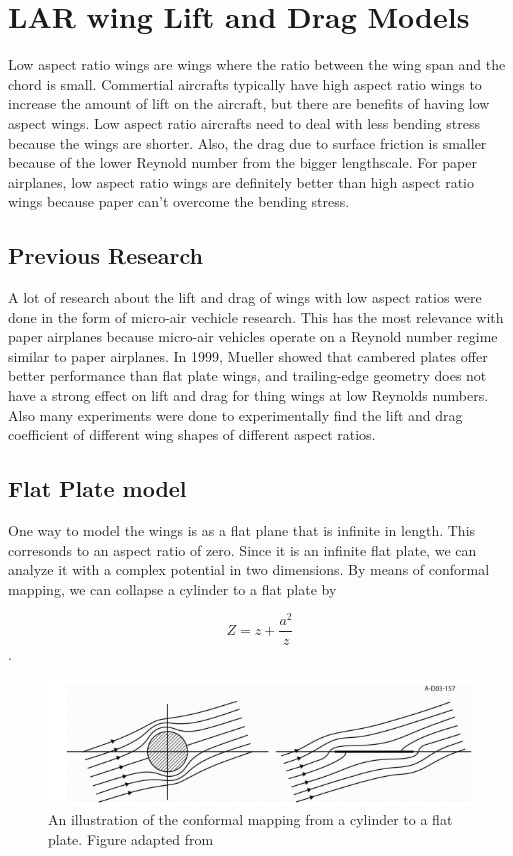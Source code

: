 
\section{LAR wing Lift and Drag Models}

Low aspect ratio wings are wings where the ratio between the wing span and
the chord is small. Commertial aircrafts typically have high aspect ratio wings
to increase the amount of lift on the aircraft, but there are benefits of having
low aspect wings. Low aspect ratio aircrafts need to deal with less bending
stress because the wings are shorter. Also, the drag due to surface friction is
smaller because of the lower Reynold number from the bigger lengthscale.
For paper airplanes, low aspect ratio wings are definitely better than high
aspect ratio wings because paper can't overcome the
bending stress.


\subsection{Previous Research}

A lot of research about the lift and drag of wings with low aspect ratios  were done in the form of
micro-air vechicle research. This has the most relevance with paper airplanes because
micro-air vehicles operate on a Reynold number regime similar to paper airplanes. 
In 1999, Mueller showed that cambered plates offer better performance than flat plate wings, and
trailing-edge geometry does not have a strong effect on lift and drag
for thing wings at low Reynolds numbers. Also many experiments were done to experimentally
find the lift and drag coefficient of different wing shapes of different aspect ratios.

\subsection{Flat Plate model}

One way to model the wings is as a flat plane that is infinite in length. This corresonds to
an aspect ratio of zero. Since it is
an infinite flat plate, we can analyze it with a complex potential in two dimensions.
By means of conformal mapping, we can collapse a cylinder to a flat plate by

\[Z = z + \frac{a^2}{z}\].

\begin{figure}[hl]
  \centering
    \includegraphics[scale=.5]{figures/flatplate1.png}
    \caption{An illustration of the conformal mapping from a cylinder to a flat plate. Figure adapted from ~\cite{thintheory}}
  \label{fig:dihedraleffect}
\end{figure}

